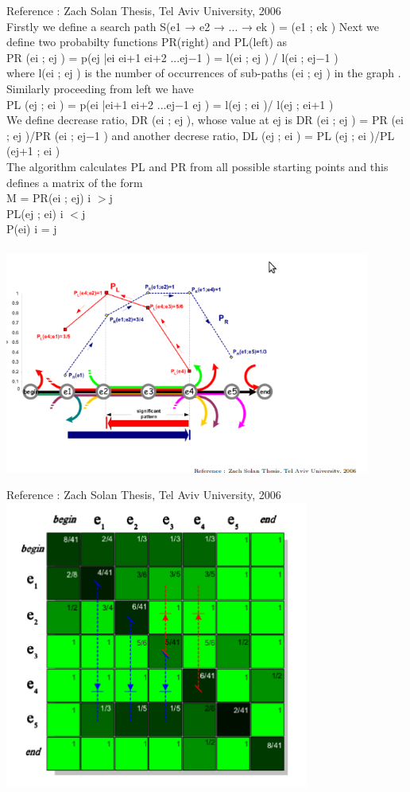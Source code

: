 \def\DevnagVersion{2.15}\documentclass[14 pt]{article}
\begin{document}
\hfill {\scriptsize Reference : Zach Solan Thesis, Tel Aviv University, 2006}
\\
Firstly we define a search path S(e1 → e2 → ... → ek ) = (e1 ; ek )
Next we define two probabilty functions PR(right) and PL(left) as
\\
PR (ei ; ej ) = p(ej |ei ei+1 ei+2 ...ej−1 ) = l(ei ; ej ) / l(ei ; ej−1 )
\\
where l(ei ; ej ) is the number of occurrences of sub-paths (ei ; ej ) in the graph .
\\
Similarly proceeding from left we have
\\
PL (ej ; ei ) = p(ei |ei+1 ei+2 ...ej−1 ej ) = l(ej ; ei )/ l(ej ; ei+1 )
\\
We define decrease ratio, DR (ei ; ej ), whose value at ej is DR (ei ; ej ) = PR (ei ; ej )/PR (ei ; ej−1 )
and another decrese ratio, DL (ej ; ei ) = PL (ej ; ei )/PL (ej+1 ; ei )
\\
The algorithm calculates PL and PR from all possible starting points and this defines a matrix of the form
\\
M =  { PR(ei ; ej) i $>$j\\  
           PL(ej ; ei)    i $<$j\\
	   P(ei) 	      i = j\\
         }\\
\includegraphics[width=12cm]{pattern.png}

\hfill {\scriptsize Reference : Zach Solan Thesis, Tel Aviv University, 2006}\\
\includegraphics[width=10cm]{a.png}
\end{document}
